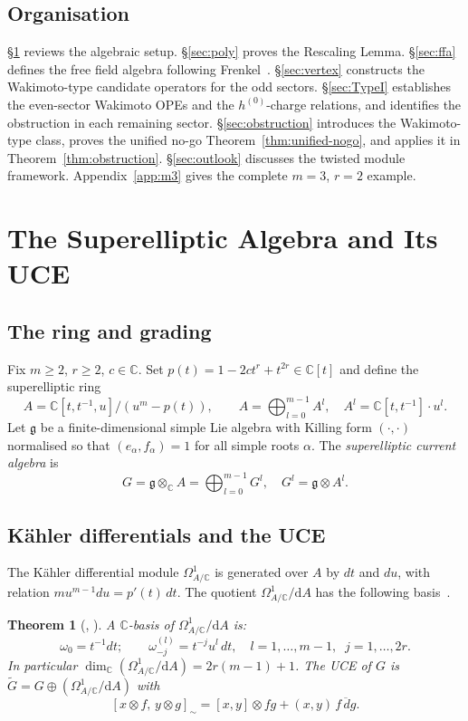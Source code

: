 \documentclass[12pt]{article}
\theoremstyle{plain}
\newtheorem{theorem}{Theorem}[section]
\theoremstyle{definition}
\theoremstyle{remark}
\newcommand{\C}{\mathbb{C}}
\newcommand{\g}{\mathfrak{g}}
\newcommand{\gtil}{\widetilde{G}}
\newcommand{\dR}{\mathrm{d}A}
\newcommand{\OmegaA}{\Omega^{1}_{A/\C}}
\newcommand{\Kill}[2]{(#1,#2)}
\begin{document}
\subsection{Organisation}
\S\ref{sec:setup} reviews the algebraic setup.
\S\ref{sec:poly} proves the Rescaling Lemma.
\S\ref{sec:ffa} defines the free field algebra following Frenkel~\cite{Frenkel2005}.
\S\ref{sec:vertex} constructs the Wakimoto-type candidate operators for the odd sectors.
\S\ref{sec:TypeI} establishes the even-sector Wakimoto OPEs and the
$h^{(0)}$-charge relations, and identifies the obstruction in each
remaining sector.
\S\ref{sec:obstruction} introduces the Wakimoto-type class, proves the
unified no-go Theorem~\ref{thm:unified-nogo}, and applies it in Theorem~\ref{thm:obstruction}.
\S\ref{sec:outlook} discusses the twisted module framework.
Appendix~\ref{app:m3} gives the complete $m=3$, $r=2$ example.
\section{The Superelliptic Algebra and Its UCE}\label{sec:setup}
\subsection{The ring and grading}
Fix $m\geq 2$, $r\geq 2$, $c\in\C$.
Set $p(t)=1-2ct^r+t^{2r}\in\C[t]$ and define the superelliptic ring
\begin{equation}\label{eq:A}
  A = \C[t,t^{-1},u]\big/(u^m-p(t)),\qquad
  A = \bigoplus_{l=0}^{m-1}A^l,\quad A^l = \C[t,t^{-1}]\cdot u^l.
\end{equation}
Let $\g$ be a finite-dimensional simple Lie algebra with Killing form
$\Kill{\cdot}{\cdot}$ normalised so that $\Kill{e_\alpha}{f_\alpha}=1$ for all
simple roots $\alpha$.
The \emph{superelliptic current algebra} is
\[
  G = \g\otimes_\C A = \bigoplus_{l=0}^{m-1}G^l,\quad
  G^l = \g\otimes A^l.
\]
\subsection{\texorpdfstring{K\"{a}hler}{Kahler} differentials and the UCE}
The K\"{a}hler differential module $\OmegaA$ is generated over $A$ by $dt$ and
$du$, with relation $mu^{m-1}du = p'(t)\,dt$.
The quotient $\OmegaA/\dR$ has the following basis~\cite{CoxFutorny-UCE}.
\begin{theorem}[{\cite[Thm.~3.5]{CoxFutorny-UCE}, \cite[Thm.~1.3]{SNF-I}}]\label{thm:UCE-basis}
  A $\C$-basis of $\OmegaA/\dR$ is:
  \begin{equation}\label{eq:basis}
    \omega_0 = t^{-1}dt;\qquad
    \omega^{(l)}_{-j} = t^{-j}u^l\,dt,\quad l=1,\ldots,m-1,\;\;j=1,\ldots,2r.
  \end{equation}
  In particular $\dim_\C(\OmegaA/\dR)=2r(m-1)+1$.
  The UCE of $G$ is $\gtil = G\oplus(\OmegaA/\dR)$ with
  \begin{equation}\label{eq:UCE-bracket}
    [x\otimes f,\,y\otimes g]_\sim = [x,y]\otimes fg + \Kill{x}{y}\,\overline{f\,dg}.
  \end{equation}
\end{theorem}
\end{document}
